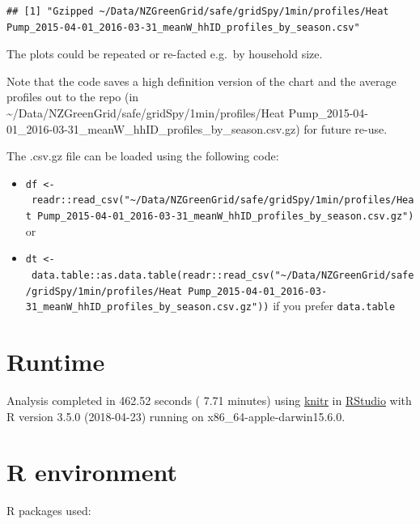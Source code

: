 \documentclass[]{article}
\providecommand{\tightlist}{%
  \setlength{\itemsep}{0pt}\setlength{\parskip}{0pt}}
\begin{document}
\begin{verbatim}
## [1] "Gzipped ~/Data/NZGreenGrid/safe/gridSpy/1min/profiles/Heat Pump_2015-04-01_2016-03-31_meanW_hhID_profiles_by_season.csv"
\end{verbatim}

The plots could be repeated or re-facted e.g.~by household size.

Note that the code saves a high definition version of the chart and the
average profiles out to the repo (in
\textasciitilde{}/Data/NZGreenGrid/safe/gridSpy/1min/profiles/Heat
Pump\_2015-04-01\_2016-03-31\_meanW\_hhID\_profiles\_by\_season.csv.gz)
for future re-use.

The .csv.gz file can be loaded using the following code:

\begin{itemize}
\tightlist
\item
  \texttt{df\ \textless{}-\ readr::read\_csv("\textasciitilde{}/Data/NZGreenGrid/safe/gridSpy/1min/profiles/Heat\ Pump\_2015-04-01\_2016-03-31\_meanW\_hhID\_profiles\_by\_season.csv.gz")}
  or
\item
  \texttt{dt\ \textless{}-\ data.table::as.data.table(readr::read\_csv("\textasciitilde{}/Data/NZGreenGrid/safe/gridSpy/1min/profiles/Heat\ Pump\_2015-04-01\_2016-03-31\_meanW\_hhID\_profiles\_by\_season.csv.gz"))}
  if you prefer \texttt{data.table}
\end{itemize}

\section{Runtime}\label{runtime}

Analysis completed in 462.52 seconds ( 7.71 minutes) using
\href{https://cran.r-project.org/package=knitr}{knitr} in
\href{http://www.rstudio.com}{RStudio} with R version 3.5.0 (2018-04-23)
running on x86\_64-apple-darwin15.6.0.

\section{R environment}\label{r-environment}

R packages used:
\end{document}
